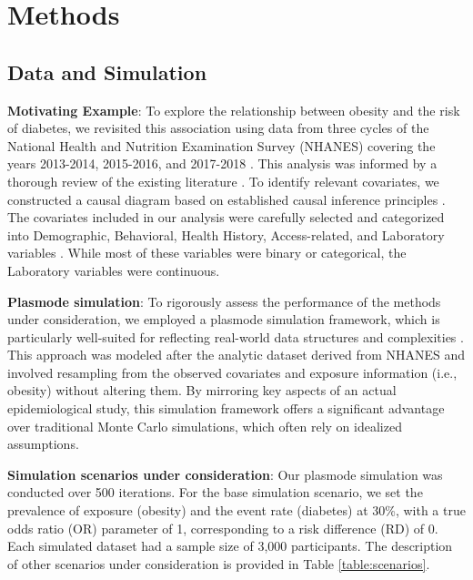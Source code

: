 \documentclass[sn-vancouver,Numbered,lineno,pdflatex]{sn-jnl}
\begin{document}
\section{Methods}\label{methods}

\subsection*{Data and Simulation}\label{data-and-simulation}

\textbf{Motivating Example}: To explore the relationship between obesity
and the risk of diabetes, we revisited this association using data from
three cycles of the National Health and Nutrition Examination Survey
(NHANES) covering the years 2013-2014, 2015-2016, and 2017-2018
\citep{karim2024high}. This analysis was informed by a thorough review
of the existing literature
\citep{saydah2014trends, liu2013association, kabadi2012joint, ostchega2012abdominal}.
To identify relevant covariates, we constructed a causal diagram based
on established causal inference principles \citep{greenland1999causal}.
The covariates included in our analysis were carefully selected and
categorized into Demographic, Behavioral, Health History,
Access-related, and Laboratory variables \citep{karim2024high}. While
most of these variables were binary or categorical, the Laboratory
variables were continuous.

\textbf{Plasmode simulation}: To rigorously assess the performance of
the methods under consideration, we employed a plasmode simulation
framework, which is particularly well-suited for reflecting real-world
data structures and complexities \citep{franklin2014plasmode}. This
approach was modeled after the analytic dataset derived from NHANES and
involved resampling from the observed covariates and exposure
information (i.e., obesity) without altering them. By mirroring key
aspects of an actual epidemiological study, this simulation framework
offers a significant advantage over traditional Monte Carlo simulations,
which often rely on idealized assumptions.

\textbf{Simulation scenarios under consideration}: Our plasmode
simulation was conducted over 500 iterations. For the base simulation
scenario, we set the prevalence of exposure (obesity) and the event rate
(diabetes) at 30\%, with a true odds ratio (OR) parameter of 1,
corresponding to a risk difference (RD) of 0. Each simulated dataset had
a sample size of 3,000 participants. The description of other scenarios
under consideration is provided in Table \ref{table:scenarios}.
\end{document}
